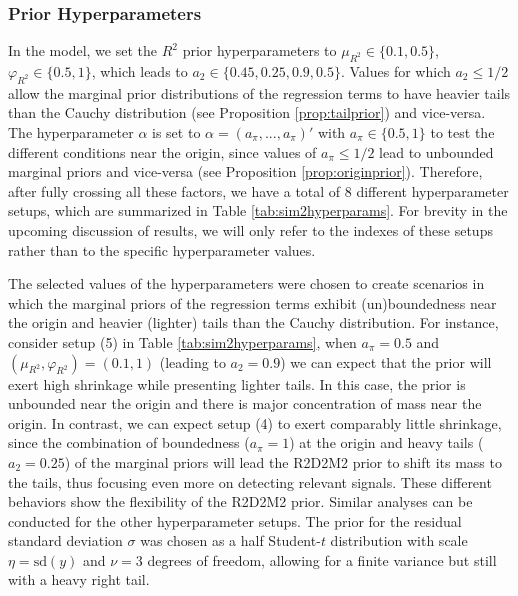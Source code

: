 \subsubsection{Prior Hyperparameters}
\label{subsubsection:priorhyperparams}
In the model, we set the $R^2$ prior hyperparameters to $\mu_{R^2}\in \{0.1,0.5\}$, $\varphi_{R^2} \in \{0.5,1\}$, which leads to $a_2 \in \{ 0.45, 0.25, 0.9, 0.5\}$. Values for which $a_2 \leq 1/2$ allow the marginal prior distributions of the regression terms to have heavier tails than the Cauchy distribution (see Proposition \ref{prop:tailprior}) and vice-versa. The hyperparameter $\alpha$ is set to $\alpha=(a_\pi,...,a_\pi)'$ with $a_\pi \in \{0.5,1\}$ to test the different conditions near the origin, since values of $a_\pi \leq 1/2$ lead to unbounded marginal priors and vice-versa (see Proposition \ref{prop:originprior}). Therefore, after fully crossing all these factors, we have a total of 8 different hyperparameter setups, which are summarized in Table \ref{tab:sim2hyperparams}. For brevity in the upcoming discussion of results, we will only refer to the indexes of these setups rather than to the specific hyperparameter values.
\begin{table}[ht]
\caption{Configurations of the prior hyperparameters that were selected to test the R2D2M2 model under a sparse multilevel simulation setup.  }
\label{tab:sim2hyperparams}
\centering
{}
\end{table}
The selected values of the hyperparameters were chosen to create scenarios in which the  marginal priors of the regression terms exhibit (un)boundedness near the origin and heavier (lighter) tails than the Cauchy distribution. For instance, consider setup (5) in Table \ref{tab:sim2hyperparams}, when $a_\pi= 0.5$ and $(\mu_{R^2}, \varphi_{R^2})=(0.1,1)$ (leading to $a_2=0.9$) we can expect that the prior will exert high shrinkage while presenting lighter tails. In this case, the prior is unbounded near the origin and there is major concentration of mass near the origin. In contrast, we can expect setup (4) to exert comparably little shrinkage, since the combination of boundedness ($a_\pi=1$) at the origin and heavy tails ($a_2=0.25$) of the marginal priors will lead the R2D2M2 prior to shift its mass to the tails, thus focusing even more on detecting relevant signals. These different behaviors show the flexibility of the R2D2M2 prior. Similar analyses can be conducted for the other hyperparameter setups. The prior for the residual standard deviation $\sigma$ was chosen as a half Student-$t$ distribution with scale $\eta = \text{sd}(y)$ and $\nu=3$ degrees of freedom, allowing for a finite variance but still with a heavy right tail.

